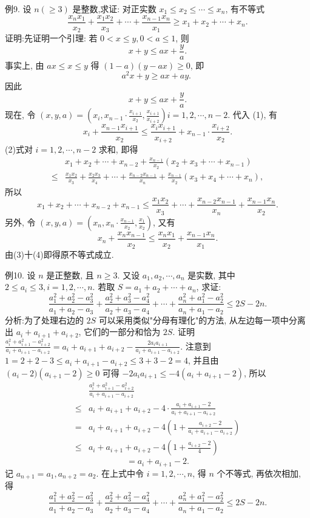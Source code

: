 例9. 设 $n(\geqslant 3)$ 是整数,求证: 对正实数 $x_1 \leqslant x_2 \leqslant \cdots \leqslant x_n$, 有不等式
$$
\frac{x_n x_1}{x_2}+\frac{x_1 x_2}{x_3}+\cdots+\frac{x_{n-1} x_n}{x_1} \geqslant x_1+x_2+\cdots+x_n .
$$
证明:先证明一个引理: 若 $0<x \leqslant y, 0<a \leqslant 1$, 则
$$
x+y \leqslant a x+\frac{y}{a} . \label{(1)}
$$
事实上, 由 $a x \leqslant x \leqslant y$ 得 $(1-a)(y-a x) \geqslant 0$, 即
$$
a^2 x+y \geqslant a x+a y \text {. }
$$
因此
$$
x+y \leqslant a x+\frac{y}{a} .
$$
现在, 令 $(x, y, a)=\left(x_i, x_{n-1} \cdot \frac{x_{i+1}}{x_2}, \frac{x_{i+1}}{x_{i+2}}\right) i=1,2, \cdots, n-2$. 代入
(1), 有
$$
x_i+\frac{x_{n-1} x_{i+1}}{x_2} \leqslant \frac{x_i x_{i+1}}{x_{i+2}}+x_{n-1} \cdot \frac{x_{i+2}}{x_2} . \label{(2)}
$$
(2)式对 $i=1,2, \cdots, n-2$ 求和, 即得
$$
\begin{aligned}
& x_1+x_2+\cdots+x_{n-2}+\frac{x_{n-1}}{x_2}\left(x_2+x_3+\cdots+x_{n-1}\right) \\
\leqslant & \frac{x_1 x_2}{x_3}+\frac{x_2 x_3}{x_4}+\cdots+\frac{x_{n-2} x_{n-1}}{x_n}+\frac{x_{n-1}}{x_2}\left(x_3+x_4+\cdots+x_n\right),
\end{aligned}
$$
所以
$$
x_1+x_2+\cdots+x_{n-2}+x_{n-1} \leqslant \frac{x_1 x_2}{x_3}+\cdots+\frac{x_{n-2} x_{n-1}}{x_n}+\frac{x_{n-1} x_n}{x_2} . \label{(3)}
$$
另外, 令 $(x, y, a)=\left(x_n, x_n \cdot \frac{x_{n-1}}{x_2}, \frac{x_1}{x_2}\right)$, 又有
$$
x_n+\frac{x_n x_{n-1}}{x_2} \leqslant \frac{x_n x_1}{x_2}+\frac{x_{n-1} x_n}{x_1} . \label{(4)}
$$
由(3)十(4)即得原不等式成立.



例10. 设 $n$ 是正整数, 且 $n \geqslant 3$. 又设 $a_1, a_2, \cdots, a_n$ 是实数, 其中 $2 \leqslant a_i \leqslant 3, i=1,2, \cdots, n$. 若取 $S=a_1+a_2+\cdots+a_n$, 求证:
$$
\frac{a_1^2+a_2^2-a_3^2}{a_1+a_2-a_3}+\frac{a_2^2+a_3^2-a_4^2}{a_2+a_3-a_4}+\cdots+\frac{a_n^2+a_1^2-a_2^2}{a_n+a_1-a_2} \leqslant 2 S-2 n .
$$
分析:为了处理右边的 $2 S$ 可以采用类似"分母有理化"的方法, 从左边每一项中分离出 $a_i+a_{i+1}+a_{i+2}$, 它们的一部分和恰为 $2 S$.
证明 $\frac{a_i^2+a_{i+1}^2-a_{i+2}^2}{a_i+a_{i+1}-a_{i+2}}=a_i+a_{i+1}+a_{i+2}-\frac{2 a_i a_{i+1}}{a_i+a_{i+1}-a_{i+2}}$.
注意到 $1=2+2-3 \leqslant a_i+a_{i+1}-a_{i+2} \leqslant 3+3-2=4$, 并且由 $\left(a_i-\right. 2)\left(a_{i+1}-2\right) \geqslant 0$ 可得 $-2 a_i a_{i+1} \leqslant-4\left(a_i+a_{i+1}-2\right)$, 所以
$$
\begin{aligned}
& \frac{a_i^2+a_{i+1}^2-a_{i+2}^2}{a_i+a_{i+1}-a_{i+2}} \\
\leqslant & a_i+a_{i+1}+a_{i+2}-4 \cdot \frac{a_i+a_{i+1}-2}{a_i+a_{i+1}-a_{i+2}} \\
= & a_i+a_{i+1}+a_{i+2}-4\left(1+\frac{a_{i+2}-2}{a_i+a_{i+1}-a_{i+2}}\right) \\
\leqslant & a_i+a_{i+1}+a_{i+2}-4\left(1+\frac{a_{i+2}-2}{4}\right)
\end{aligned}
$$
$$
=a_i+a_{i+1}-2 .
$$
记 $a_{n+1}=a_1, a_{n+2}=a_2$. 在上式中令 $i=1,2, \cdots, n$, 得 $n$ 个不等式, 再依次相加, 得
$$
\frac{a_1^2+a_2^2-a_3^2}{a_1+a_2-a_3}+\frac{a_2^2+a_3^2-a_4^2}{a_2+a_3-a_4}+\cdots+\frac{a_n^2+a_1^2-a_2^2}{a_n+a_1-a_2} \leqslant 2 S-2 n .
$$


